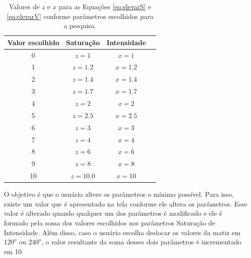 \documentclass[	12pt, Times, openright, twoside, a4paper, english, brazil]{abntex2}
\begin{document}
\begin{table}[ht]
\centering
\begin{tabular}{cccc}
\hline      
\textbf{Valor escolhido} & \textbf{Saturação} & \textbf{Intensidade}     \\ \hline
0                        & $z = 1$            &  $x = 1$                          \\ \hline
1                        & $z = 1.2$          &  $x = 1.2$                          \\ \hline
2                        & $z = 1.4$          &  $x = 1.4$                          \\ \hline 
3                        & $z = 1.7$          &  $x = 1.7$                          \\ \hline
4                        & $z = 2$            &  $x = 2$                            \\ \hline
5                        & $z = 2.5$          &  $x = 2.5$                           \\ \hline
6                        & $z = 3$            &  $x = 3$                           \\ \hline
7                        & $z = 4$            &  $x = 4$                           \\ \hline
8                        & $z = 6$            &  $x = 6$                           \\ \hline
9                        & $z = 8$            &  $x = 8$                           \\ \hline
10                       & $z = 10.0$         &  $x = 10$                           \\ \hline

\end{tabular}
\caption{Valores de $z$ e $x$ para as Equações \ref{eq:elevarS} e \ref{eq:elevarV} conforme parâmetros escolhidos para a pesquisa.}
\label{tab:parametrosPesquisa}
\end{table}

O objetivo é que o usuário altere os parâmetros o mínimo possível. Para isso, existe um valor que é apresentado na tela conforme ele altera os parâmetros. Esse valor é alterado quando qualquer um dos parâmetros é modificado e ele é formado pela soma dos valores escolhidos nos parâmetros Saturação de Intensidade. Além disso, caso o usuário escolha deslocar os valores da matiz em $120^o$ ou $240^o$, o valor resultante da soma desses dois parâmetros é incrementado em 10.
\end{document}
